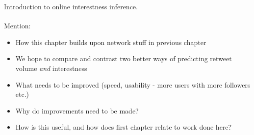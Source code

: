 Introduction to online interestness inference.
\\ \\

Mention:
\begin{itemize}
\item How this chapter builds upon network stuff in previous chapter
\item We hope to compare and contrast two better ways of predicting retweet volume \emph{and} interestness
\item What needs to be improved (speed, usability - more users with more followers etc.)
\item Why do improvements need to be made?
\item How is this useful, and how does first chapter relate to work done here?
\end{itemize}


